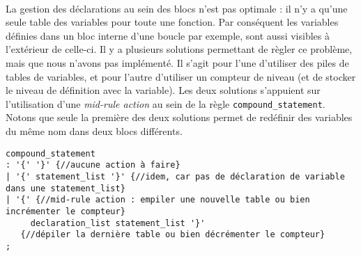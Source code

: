 \documentclass[a4paper,10pt]{article}
\begin{document}
\paragraph{}
La gestion des déclarations au sein des blocs n'est pas optimale : il n'y a qu'une seule table des variables pour toute une fonction. Par conséquent les variables définies dans un bloc interne d'une boucle par exemple, sont aussi visibles à l'extérieur de celle-ci. Il y a plusieurs solutions permettant de règler ce problème, mais que nous n'avons pas implémenté. Il s'agit pour l'une d'utiliser des piles de tables de variables, et pour l'autre d'utiliser un compteur de niveau (et de stocker le niveau de définition avec la variable). Les deux solutions s'appuient sur l'utilisation d'une \emph{mid-rule action} au sein de la règle \verb!compound_statement!. Notons que seule la première des deux solutions permet de redéfinir des variables du même nom dans deux blocs différents.\\

\begin{verbatim}
compound_statement
: '{' '}' {//aucune action à faire}
| '{' statement_list '}' {//idem, car pas de déclaration de variable dans une statement_list}
| '{' {//mid-rule action : empiler une nouvelle table ou bien incrémenter le compteur} 
     declaration_list statement_list '}' 
   {//dépiler la dernière table ou bien décrémenter le compteur}
; 
\end{verbatim}
\end{document}
